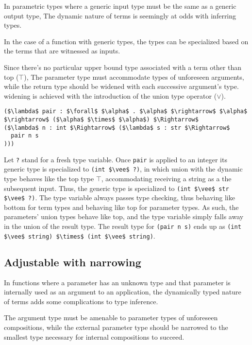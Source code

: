 \documentclass[manuscript]{acmart}
\theoremstyle{definition}
\begin{document}
In parametric types where a generic input type must be the same as a generic output type,
The dynamic nature of terms is seemingly at odds with inferring types.

In the case of a function with generic types, 
the types can be specialized based on the terms that are witnessed as inputs. 

Since there's no particular upper bound type associated with 
a term other than top ($\top$), 
The parameter type must accommodate types of unforeseen arguments, 
while the return type should be widened with each successive
argument's type.
widening is achieved with the introduction of the union type operator ($\vee$).

\begin{lstlisting}
($\lambda$ pair : $\forall$ $\alpha$ . $\alpha$ $\rightarrow$ $\alpha$ $\rightarrow$ ($\alpha$ $\times$ $\alpha$) $\Rightarrow$ 
($\lambda$ n : int $\Rightarrow$ ($\lambda$ s : str $\Rightarrow$ 
  pair n s
)))
\end{lstlisting}

Let \lstinline{?} stand for a fresh type variable.
Once \lstinline{pair} is applied to an integer its generic type is specialized to 
\lstinline{(int $\vee$ ?)}, 
in which union with the dynamic type behaves like the top type $\top$, 
accommodating receiving a string as a the subsequent input.
Thus, the generic type is specialized to 
\newline
\lstinline{(int $\vee$ str $\vee$ ?)}.
The type variable always passes type checking, 
thus behaving like bottom for term types
and behaving like top for parameter types.
As such, the parameters' union types behave like top,
and the type variable simply falls away in the union of the result type. 
The result type for \lstinline{(pair n s)} ends up as 
\newline
\lstinline{(int $\vee$ string) $\times$ (int $\vee$ string)}. 

\subsection{Adjustable with narrowing}

In functions where a parameter has an unknown type and that parameter is 
internally used as an argument to an application, the dynamically typed 
nature of terms adds some complications to type inference.

The argument type must be amenable to parameter types 
of unforeseen compositions,
while the external parameter type should be narrowed 
to the smallest type necessary for internal compositions to
succeed.
\end{document}
